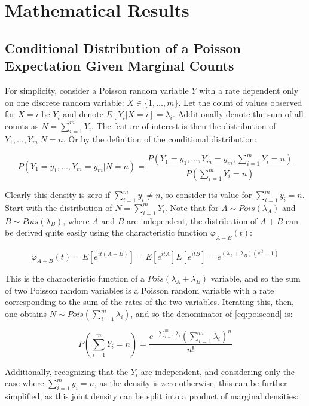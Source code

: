 \chapter{Mathematical Results} \label{app:mathres}

\section{Conditional Distribution of a Poisson Expectation Given Marginal Counts}

For simplicity, consider a Poisson random variable $Y$ with a rate dependent only on one discrete random variable: $X \in \{1,
\dots, m\}$. Let the count of values observed for $X = i$ be $Y_i$ and denote $E[Y_i | X = i] = \lambda_i$. Additionally denote
the sum of all counts as $N = \sum_{i = 1}^m Y_i$. The feature of interest is then the distribution of $Y_1, \dots, Y_m | N =
n$. Or by the definition of the conditional distribution:

\begin{equation}
  P (Y_1 = y_1 ,\dots, Y_m = y_m | N = n) = \frac{P(Y_1 = y_1, \dots, Y_m = y_m, \sum_{i = 1}^{m} Y_i = n)}{P(\sum_{i =
        1}^{m} Y_i = n)}
  \label{eq:poiscond}
\end{equation}

Clearly this density is zero if $\sum_{i=1}^m y_i \neq n$, so consider its value for $\sum_{i=1}^m y_i = n$. Start with
the distribution of $N = \sum_{i = 1}^{m} Y_i$. Note that for $A \sim Pois(\lambda_A)$ and $B \sim Pois(\lambda_B)$, where $A$ and
$B$ are independent, the distribution of $A + B$ can be derived quite easily using the characteristic function $\varphi_{A+B}(t)$:

$$\varphi_{A+B}(t) = E[e^{it(A+B)}] = E[e^{itA}]E[e^{itB}] = e^{(\lambda_A + \lambda_B)(e^{it} - 1)}$$

This is the characteristic function of a $Pois(\lambda_A + \lambda_B)$ variable, and so the sum of two Poisson random variables is
a Poisson random variable with a rate corresponding to the sum of the
rates of the two variables. Iterating this, then, one obtains $N \sim
Pois(\sum_{i=1}^m \lambda_i)$, and so the denominator of \ref{eq:poiscond} is:

$$P \left (\sum_{i = 1}^m Y_i = n \right ) = \frac{e^{-\sum_{i=1}^m \lambda_i} (\sum_{i=1}^m \lambda_i)^n}{n!}$$

Additionally, recognizing that the $Y_i$ are independent, and considering only the case where $\sum_{i=1}^m y_i = n$, as the
density is zero otherwise, this can be further simplified, as this joint density can be split into a product of marginal
densities: 

